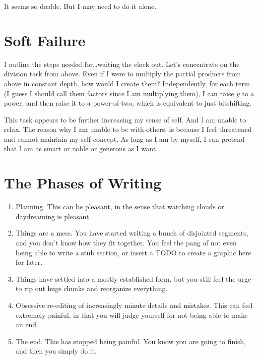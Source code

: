 \documentclass{article}
\begin{document}
It seems so doable. But I may need to do it alone.

\section{Soft Failure}

I outline the steps needed for\ldots waiting the clock out.
Let's concentrate on the division task from above.
Even if I were to multiply the partial products from above in
constant depth, how would I create them? Independently, for each term
(I guess I should call them factors since I am multiplying them),
I can raise $y$ to a power, and then raise it to a power-of-two,
which is equivalent to just bitshifting.

This task appears to be further increasing my sense of self.
And I am unable to relax.
The reason why I am unable to be with others, is because I feel
threatened and cannot maintain my self-concept. As long as I am by myself,
I can pretend that I am as smart or noble or generous as I want.

\section{The Phases of Writing}

\begin{enumerate}
\item
Planning. This can be pleasant, in the sense that watching clouds or
daydreaming is pleasant.
\item
Things are a mess. You have started writing a bunch of disjointed
segments, and you don't know how they fit together. You feel the pang
of not even being able to write a stub section, or insert a TODO to
create a graphic here for later.

\begin{figure}
\end{figure}

\item
Things have settled into a mostly established form, but you still feel
the urge to rip out huge chunks and reorganize everything.

\item
Obsessive re-editing of increasingly minute details and mistakes.
This can feel extremely painful, in that you will judge yourself for not
being able to make an end.

\item
The end. This has stopped being painful. You know you are going to finish,
and then you simply do it.

\end{enumerate}
\end{document}
